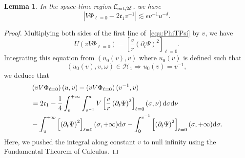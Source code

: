 \documentclass[a4paper,reqno]{amsart}
\newtheorem{lemma}[theorem]{Lemma}
\theoremstyle{definition}
\numberwithin{equation}{section}
\def \d {{\rm{d}}}
\def \pt{\partial_{t}}
\def\ep{\epsilon}
\begin{document}
\begin{lemma}
In the space-time region $\mathcal{C}_{{\rm{ext}},2\delta}$, we have 
\begin{equation}\label{est:VPhi}
\left|V\Phi_{\ell=0}-2\mathfrak{c}_{1}v^{-1}\right|\lesssim \ep v^{-1}u^{-\delta}.
\end{equation}
\end{lemma}
\begin{proof}
Multiplying both sides of the first line of~\eqref{equ:PhiTPsi} by $v$, we have 
\begin{equation*}
U\left(vV\Phi_{\ell=0}\right)=\left[\frac{v}{r}\left(\pt \Psi\right)^{2}\right]_{\ell=0}.
\end{equation*}
Integrating this equation from $(u_{0}(v),v)$ where $u_{0}(v)$ is defined such that 
\begin{equation*}
    (u_{0}(v),v,\omega)\in \mathcal{H}_{1}\Longrightarrow u_{0}(v)=v^{-1},
\end{equation*}
we deduce that
\begin{equation*}
\begin{aligned}
&\left(vV\Phi_{\ell=0}\right)(u,v)-\left(vV\Phi_{\ell=0}\right)(v^{-1},v)\\
&=2\mathfrak{c}_{1}-\frac{1}{4}\int_{v}^{+\infty}\int_{v^{-1}}^{u}V\left[\frac{v}{r}\left(\pt \Psi\right)^{2}\right]_{\ell=0}\left(\sigma,\nu\right)\d \sigma \d \nu\\
&-\int_{u}^{+\infty}\left[\left(\pt \Psi\right)^{2}\right]_{\ell=0}(\sigma,+\infty)\d \sigma-\int_{0}^{v^{-1}}\left[\left(\pt \Psi\right)^{2}\right]_{\ell=0}(\sigma,+\infty)\d \sigma.
\end{aligned}
\end{equation*}
Here, we pushed the integral along constant $v$ to null infinity using the Fundamental Theorem of Calculus.


\end{proof}
\end{document}

